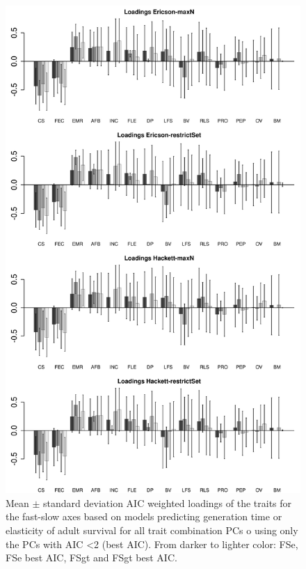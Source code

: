 \begin{figure}[ht!]
\centering
\includegraphics[width=.8\textwidth]{./Figures/Appendix2_1/FS loadings plots-ALL.png}
\caption[LHT loadings of the FS axes]{
Mean $\pm$ standard deviation AIC weighted loadings of the traits for the
fast-slow axes based on models predicting generation time or elasticity of
adult survival for all trait combination PCs o using only the PCs with AIC
\textless{2} (best AIC). From darker to lighter color: FSe, FSe best AIC, FSgt
and FSgt best AIC.}
\label{fig:figApp2.1.1}
\end{figure}

